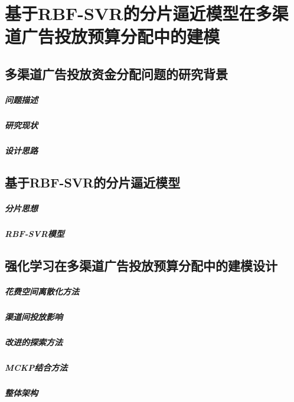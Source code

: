 \chapter{基于RBF-SVR的分片逼近模型在多渠道广告投放预算分配中的建模}



\section{多渠道广告投放资金分配问题的研究背景}
\paragraph{问题描述}
\paragraph{研究现状}
\paragraph{设计思路}

\section{基于RBF-SVR的分片逼近模型}
\paragraph{分片思想}
\paragraph{RBF-SVR模型}

\section{强化学习在多渠道广告投放预算分配中的建模设计}
\paragraph{花费空间离散化方法}
\paragraph{渠道间投放影响}
\paragraph{改进的探索方法}
\paragraph{MCKP结合方法}
\paragraph{整体架构}